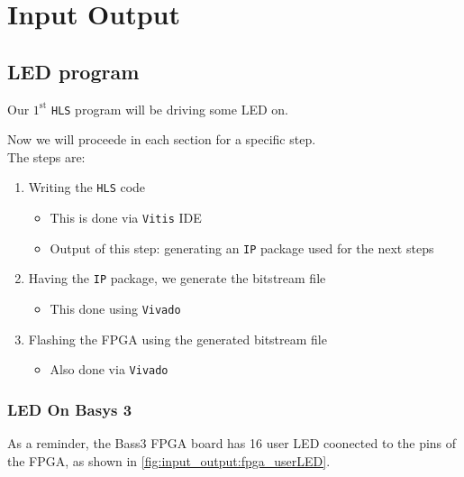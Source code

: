 


\chapter{Input Output}


\section{LED program}

Our $\mathrm{1}^\mathrm{st}$ \verb|HLS| program will be driving some LED on.

Now we will proceede in each section for a specific step.\\

The steps are:

\begin{enumerate}

\item Writing the \verb|HLS| code
	
	\begin{itemize}
	\item This is done via \verb|Vitis| IDE
	
	\item Output of this step: generating an \verb|IP| package used for the next steps
	\end{itemize}


\item Having the \verb|IP| package, we generate the bitstream file

	\begin{itemize}
	\item This done using \verb|Vivado|
	

	\end{itemize}

\item Flashing the FPGA using the generated bitstream file

	\begin{itemize}
	\item Also done via \verb|Vivado|
	\end{itemize}

\end{enumerate}

\newpage
\subsection{LED On Basys 3}

As a reminder, the Bass3 FPGA board has 16 user LED coonected to the pins of the FPGA, as shown in \autoref{fig:input_output:fpga_userLED}.

